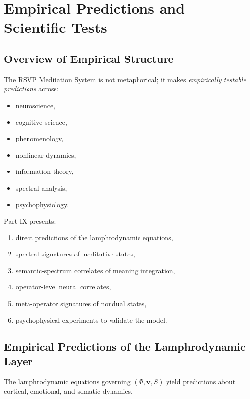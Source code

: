 \documentclass[12pt]{article}
\begin{document}
\part{Empirical Predictions and Scientific Tests}

\chapter{Overview of Empirical Structure}

The RSVP Meditation System is not metaphorical;  
it makes \emph{empirically testable predictions} across:

\begin{itemize}
    \item neuroscience,
    \item cognitive science,
    \item phenomenology,
    \item nonlinear dynamics,
    \item information theory,
    \item spectral analysis,
    \item psychophysiology.
\end{itemize}

Part IX presents:

\begin{enumerate}
    \item direct predictions of the lamphrodynamic equations,
    \item spectral signatures of meditative states,
    \item semantic-spectrum correlates of meaning integration,
    \item operator-level neural correlates,
    \item meta-operator signatures of nondual states,
    \item psychophysical experiments to validate the model.
\end{enumerate}

\newpage


\chapter{Empirical Predictions of the Lamphrodynamic Layer}

The lamphrodynamic equations governing $(\Phi,\mathbf{v},S)$ yield  
predictions about cortical, emotional, and somatic dynamics.
\end{document}

